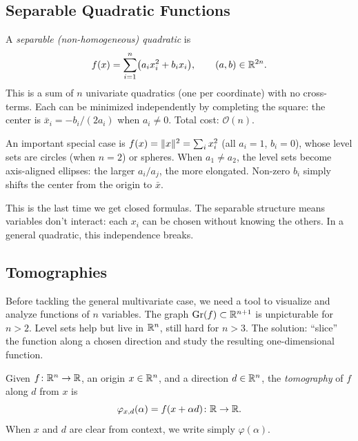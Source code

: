 \subsection{Separable Quadratic Functions}\label{sec:separable-quad}

A \emph{separable (non-homogeneous) quadratic} is
\begin{equation}\label{eq:separable-quad}
	f(x) = \sum_{i=1}^{n} \bigl(a_i x_i^2 + b_i x_i\bigr),
	\qquad (a, b) \in \mathbb{R}^{2n}.
\end{equation}
This is a sum of $n$ univariate quadratics (one per coordinate) with no cross-terms.
Each can be minimized independently by completing the square: the center is $\bar{x}_i = -b_i / (2a_i)$ when $a_i \neq 0$.
Total cost: $\mathcal{O}(n)$.

An important special case is $f(x) = \lVert x\rVert^2 = \sum_i x_i^2$ (all $a_i = 1$, $b_i = 0$), whose level sets are circles (when $n = 2$) or spheres.
When $a_1 \neq a_2$, the level sets become axis-aligned ellipses: the larger $a_i / a_j$, the more elongated.
Non-zero $b_i$ simply shifts the center from the origin to $\bar{x}$.

This is the last time we get closed formulas.
The separable structure means variables don't interact: each $x_i$ can be chosen without knowing the others.
In a general quadratic, this independence breaks.


\subsection{Tomographies}\label{sec:tomographies}

Before tackling the general multivariate case, we need a tool to visualize and analyze functions of $n$ variables.
The graph $\operatorname{Gr}(f) \subset \mathbb{R}^{n+1}$ is unpicturable for $n > 2$.
Level sets help but live in $\mathbb{R}^n$, still hard for $n > 3$.
The solution: ``slice'' the function along a chosen direction and study the resulting one-dimensional function.

\begin{definition}[Tomography]\label{def:tomography}
	Given $f \colon \mathbb{R}^n \to \mathbb{R}$, an origin $x \in \mathbb{R}^n$, and a direction $d \in \mathbb{R}^n$, the \emph{tomography} of $f$ along $d$ from $x$ is
	\begin{equation}\label{eq:tomography}
		\varphi_{x,d}(\alpha) = f(x + \alpha d) \colon \mathbb{R} \to \mathbb{R}.
	\end{equation}
	When $x$ and $d$ are clear from context, we write simply $\varphi(\alpha)$.
\end{definition}

